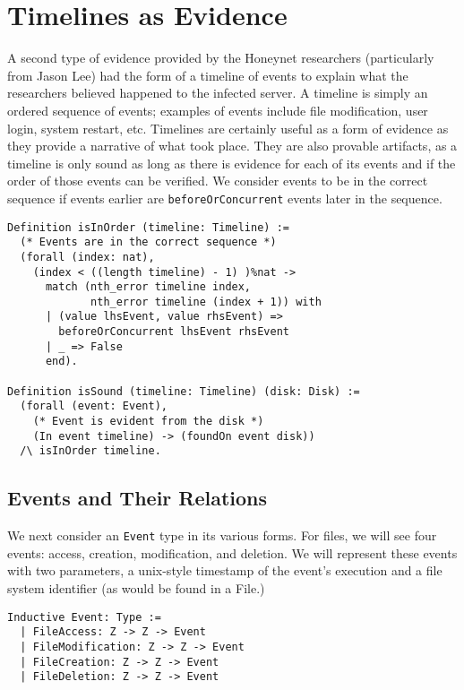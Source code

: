 \documentclass[nocopyrightspace]{sigplanconf}
\begin{document}
\section{Timelines as Evidence}

A second type of evidence provided by the Honeynet researchers (particularly
from Jason Lee\cite{lee}) had the form of a timeline of events to explain
what the researchers believed happened to the infected server. A timeline is
simply an ordered sequence of events; examples of events include file
modification, user login, system restart, etc. Timelines are certainly useful
as a form of evidence as they provide a narrative of what took place. They are
also provable artifacts, as a timeline is only sound as long as there is
evidence for each of its events and if the order of those events can be
verified. We consider events to be in the correct sequence if events earlier
are {\tt beforeOrConcurrent} events later in the sequence.

\begin{lstlisting}
Definition isInOrder (timeline: Timeline) :=
  (* Events are in the correct sequence *)
  (forall (index: nat),
    (index < ((length timeline) - 1) )%nat ->
      match (nth_error timeline index, 
             nth_error timeline (index + 1)) with
      | (value lhsEvent, value rhsEvent) => 
        beforeOrConcurrent lhsEvent rhsEvent
      | _ => False
      end).

Definition isSound (timeline: Timeline) (disk: Disk) :=
  (forall (event: Event),
    (* Event is evident from the disk *)
    (In event timeline) -> (foundOn event disk))
  /\ isInOrder timeline.
\end{lstlisting}

\subsection{Events and Their Relations}

We next consider an {\tt Event} type in its various forms. For files, we will
see four events: access, creation, modification, and deletion. We will
represent these events with two parameters, a unix-style timestamp of the
event's execution and a file system identifier (as would be found in a File.)

\begin{lstlisting}
Inductive Event: Type :=
  | FileAccess: Z -> Z -> Event
  | FileModification: Z -> Z -> Event
  | FileCreation: Z -> Z -> Event
  | FileDeletion: Z -> Z -> Event
\end{lstlisting}
\end{document}
